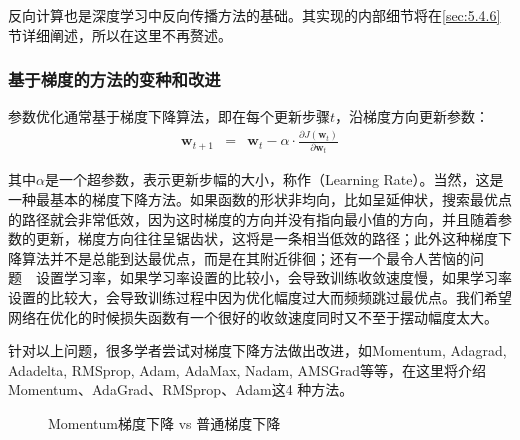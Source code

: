\parinterval  反向计算也是深度学习中反向传播方法的基础。其实现的内部细节将在\ref{sec:5.4.6}节详细阐述，所以在这里不再赘述。


\subsubsection{基于梯度的方法的变种和改进}\label{sec:5.4.2.3}

\parinterval  参数优化通常基于梯度下降算法，即在每个更新步骤$ t $，沿梯度方向更新参数：
\begin{eqnarray}
\mathbf w_{t+1}&=&\mathbf w_{t}-\alpha \cdot \frac{\partial J(\mathbf w_t)}{\partial \mathbf w_t}
\label{}
\end{eqnarray}

\noindent 其中$ \alpha $是一个超参数，表示更新步幅的大小，称作{\small{}}（Learning Rate）。当然，这是一种最基本的梯度下降方法。如果函数的形状非均向，比如呈延伸状，搜索最优点的路径就会非常低效，因为这时梯度的方向并没有指向最小值的方向，并且随着参数的更新，梯度方向往往呈锯齿状，这将是一条相当低效的路径；此外这种梯度下降算法并不是总能到达最优点，而是在其附近徘徊；还有一个最令人苦恼的问题\ \dash \ 设置学习率，如果学习率设置的比较小，会导致训练收敛速度慢，如果学习率设置的比较大，会导致训练过程中因为优化幅度过大而频频跳过最优点。我们希望网络在优化的时候损失函数有一个很好的收敛速度同时又不至于摆动幅度太大。

\parinterval  针对以上问题，很多学者尝试对梯度下降方法做出改进，如Momentum, Adagrad, Adadelta, RMSprop, Adam, AdaMax, Nadam, AMSGrad等等，在这里将介绍Momentum、AdaGrad、RMSprop、Adam这4 种方法。

\begin{figure}[htp]
\centering

\caption{Momentum梯度下降 vs 普通梯度下降}
\label{fig:5-46}
\end{figure}

%

\vspace{0.5em}
\vspace{0.5em}

